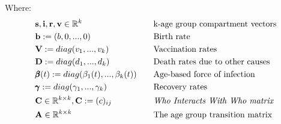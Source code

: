 \documentclass{article}
\theoremstyle{definition}
\begin{document}
Where:
\begin{align*}
&\mathbf{s}, \mathbf{i}, \mathbf{r} ,\mathbf{v}\in \mathbb{R}^k& \quad& \text{k-age group compartment vectors}\\
&\mathbf{b}:=(b,0,...,0)& \quad& \text{Birth rate}\\
&\mathbf{V}:=diag(v_1,...,v_k) &\quad& \text{Vaccination rates}\\
&\mathbf{D}:=diag(d_1,...,d_k) &\quad& \text{Death rates due to other causes}\\
&\pmb{\beta}(t):=diag(\beta_1(t),...,\beta_k(t))&\quad& \text{Age-based force of infection}\\
&\pmb{\gamma}:=diag(\gamma_1,...,\gamma_k)&\quad&\text{Recovery rates}\\
&\mathbf{C}\in \mathbb{R}^{k\times k}, \mathbf{C} := (c)_{ij} &\quad& \text{\emph{Who Interacts With Who matrix}}\\
&\mathbf{A}\in\mathbb{R}^{k\times k}&\quad& \text{The age group transition matrix}
\end{align*}
\end{document}
